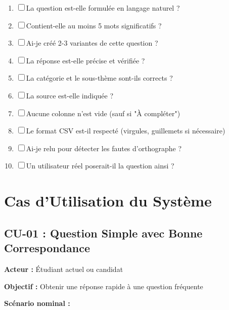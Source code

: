\documentclass[11pt,a4paper]{article}
\begin{document}
\begin{enumerate}
    \item ☐ La question est-elle formulée en langage naturel ?
    \item ☐ Contient-elle au moins 5 mots significatifs ?
    \item ☐ Ai-je créé 2-3 variantes de cette question ?
    \item ☐ La réponse est-elle précise et vérifiée ?
    \item ☐ La catégorie et le sous-thème sont-ils corrects ?
    \item ☐ La source est-elle indiquée ?
    \item ☐ Aucune colonne n'est vide (sauf si "À compléter")
    \item ☐ Le format CSV est-il respecté (virgules, guillemets si nécessaire)
    \item ☐ Ai-je relu pour détecter les fautes d'orthographe ?
    \item ☐ Un utilisateur réel poserait-il la question ainsi ?
\end{enumerate}

\clearpage

\section{Cas d'Utilisation du Système}
\label{sec:cas_utilisation}

\subsection{CU-01 : Question Simple avec Bonne Correspondance}

\textbf{Acteur :} Étudiant actuel ou candidat

\textbf{Objectif :} Obtenir une réponse rapide à une question fréquente

\textbf{Scénario nominal :}
\end{document}
